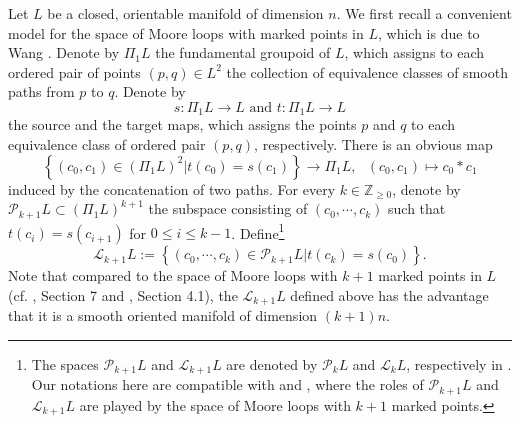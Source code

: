 \documentclass[a4paper]{article}
\numberwithin{equation}{section}
\begin{document}
Let $L$ be a closed, orientable manifold of dimension $n$. We first recall a convenient model for the space of Moore loops with marked points in $L$, which is due to Wang \cite{ywt}. Denote by $\Pi_1L$ the fundamental groupoid of $L$, which assigns to each ordered pair of points $(p,q)\in L^2$ the collection of equivalence classes of smooth paths from $p$ to $q$. Denote by
\begin{equation}
s:\Pi_1L\rightarrow L\textrm{ and }t:\Pi_1L\rightarrow L
\end{equation}
the source and the target maps, which assigns the points $p$ and $q$ to each equivalence class of ordered pair $(p,q)$, respectively. There is an obvious map
\begin{equation}
\left\{(c_0,c_1)\in(\Pi_1L)^2|t(c_0)=s(c_1)\right\}\rightarrow\Pi_1L,\textrm{ }(c_0,c_1)\mapsto c_0\ast c_1
\end{equation}
induced by the concatenation of two paths. For every $k\in\mathbb{Z}_{\geq0}$, denote by $\mathcal{P}_{k+1}L\subset(\Pi_1L)^{k+1}$ the subspace consisting of $(c_0,\cdots,c_k)$ such that $t(c_i)=s(c_{i+1})$ for $0\leq i\leq k-1$. Define\footnote{The spaces $\mathcal{P}_{k+1}L$ and $\mathcal{L}_{k+1}L$ are denoted by $\mathcal{P}_kL$ and $\mathcal{L}_kL$, respectively in \cite{ywt}. Our notations here are compatible with \cite{ki1} and \cite{ki2}, where the roles of $\mathcal{P}_{k+1}L$ and $\mathcal{L}_{k+1}L$ are played by the space of Moore loops with $k+1$ marked points.}
\begin{equation}\label{eq:flsk}
\mathcal{L}_{k+1}L:=\left\{(c_0,\cdots,c_k)\in\mathcal{P}_{k+1}L|t(c_k)=s(c_0)\right\}.
\end{equation}
Note that compared to the space of Moore loops with $k+1$ marked points in $L$ (cf. \cite{ki1}, Section 7 and \cite{ki2}, Section 4.1), the $\mathcal{L}_{k+1}L$ defined above has the advantage that it is a smooth oriented manifold of dimension $(k+1)n$.
 
\end{document}

